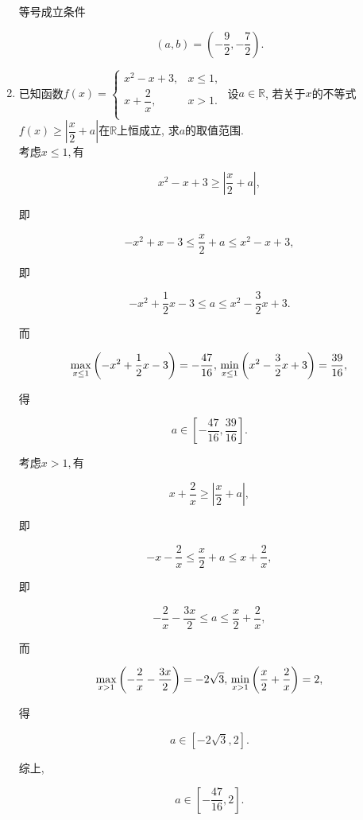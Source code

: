 \documentclass[8pt]{article}
\begin{document}
\begin{enumerate}[label=\arabic*.]
			等号成立条件

			$$(a, b)=\left(-\frac{9}{2}, -\frac{7}{2}\right).$$

		\item 已知函数$f(x)=\left\{\begin{array}{rl}x^2-x+3, &x\leq 1,\\x+\dfrac{2}{x}, &x>1.\\\end{array}\right.$ 设$a\in\mathbb{R}$, 若关于$x$的不等式$f(x)\geq\left|\dfrac{x}{2}+a\right|$在$\mathbb{R}$上恒成立, 求$a$的取值范围.
			~\\

			考虑$x\leq 1, $有

			$$x^2-x+3\geq \left|\frac{x}{2}+a\right|,$$

			即

			$$-x^2+x-3\leq \frac{x}{2}+a\leq x^2-x+3,$$

			即

			$$-x^2+\frac{1}{2}x-3\leq a\leq x^2-\frac{3}{2}x+3.$$

			而

			$$\max_{x\leq 1}\left(-x^2+\frac{1}{2}x-3\right)=-\frac{47}{16},\\\min_{x\leq 1}\left(x^2-\frac{3}{2}x+3\right)=\frac{39}{16},$$

			得

			$$a\in\left[-\frac{47}{16}, \frac{39}{16}\right].$$

			考虑$x>1, $有

			$$x+\frac{2}{x}\geq \left|\frac{x}{2}+a\right|,$$

			即

			$$-x-\frac{2}{x}\leq \frac{x}{2}+a\leq x+\frac{2}{x},$$

			即

			$$-\frac{2}{x}-\frac{3x}{2}\leq a\leq \frac{x}{2}+\frac{2}{x},$$

			而

			$$\max_{x>1}\left(-\frac{2}{x}-\frac{3x}{2}\right)=-2\sqrt{3},\\\min_{x>1}\left(\frac{x}{2}+\frac{2}{x}\right)=2,$$

			得

			$$a\in\left[-2\sqrt{3}, 2\right].$$

			综上,

			$$a\in\left[-\frac{47}{16}, 2\right].$$

	\end{enumerate}
\end{document}
